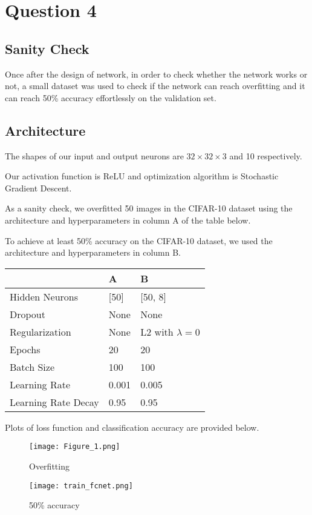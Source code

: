 \documentclass[12pt, a4paper]{article}
\begin{document}
\section*{Question 4}
\subsection*{Sanity Check}
Once after the design of network, in order to check whether the network works or not, a small dataset was used to check if the network can reach overfitting and it can reach 50\% accuracy effortlessly on the validation set.
\subsection*{Architecture}
The shapes of our input and output neurons are $32 \times 32 \times 3$ and 10 respectively.\par
\bigskip
Our activation function is ReLU and optimization algorithm is Stochastic Gradient Descent.\par
\bigskip
As a sanity check, we overfitted 50 images in the CIFAR-10 dataset using the architecture and hyperparameters in column A of the table below.\par
\bigskip
To achieve at least 50\% accuracy on the CIFAR-10 dataset, we used the architecture and hyperparameters in column B.
\begin{center}
\begin{tabular} { C{4cm} | C{2.5cm} C{3cm} }
    & A & B \\ \hline
    Hidden Neurons      & [50]  & [50, 8] \\
    Dropout				& None	& None  \\
    Regularization      & None  & L2 with $\lambda = 0$ \\
    Epochs              &   20  &   20  \\
    Batch Size          &  100  &  100  \\
    Learning Rate       & 0.001 & 0.005 \\
    Learning Rate Decay & 0.95  & 0.95
\end{tabular}
\end{center}
\bigskip

Plots of loss function and classification accuracy are provided below.

\begin{figure} [h!]
    \begin{minipage}{0.5\textwidth}
    \centering
    \texttt{[image: Figure\_1.png]}
    \caption{Overfitting} \label{Fig:Data1}
    \end{minipage}
    \begin {minipage}{0.5\textwidth}
    \centering
    \texttt{[image: train\_fcnet.png]}
    \caption{50\% accuracy} \label{Fig:Data2}
    \end{minipage}
\end{figure}
\end{document}
